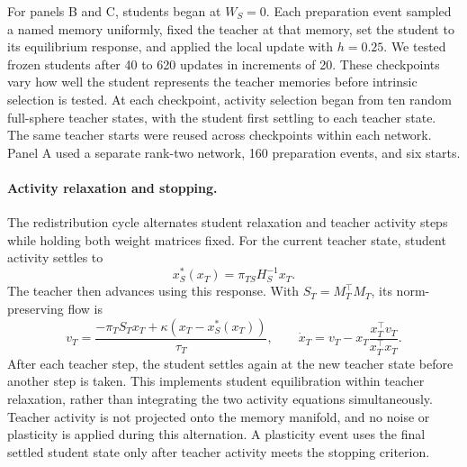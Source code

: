 \documentclass[10pt,letterpaper]{article}
\theoremstyle{plain}
\theoremstyle{remark}
\begin{document}
For panels B and C, students began at \(W_S=0\). Each preparation event sampled a named memory uniformly, fixed the teacher at that memory, set the student to its equilibrium response, and applied the local update with \(h=0.25\). We tested frozen students after 40 to 620 updates in increments of 20. These checkpoints vary how well the student represents the teacher memories before intrinsic selection is tested. At each checkpoint, activity selection began from ten random full-sphere teacher states, with the student first settling to each teacher state. The same teacher starts were reused across checkpoints within each network. Panel A used a separate rank-two network, 160 preparation events, and six starts.

\paragraph{Activity relaxation and stopping.}
The redistribution cycle alternates student relaxation and teacher activity steps while holding both weight matrices fixed. For the current teacher state, student activity settles to
\[
x_S^*(x_T)=\pi_{TS}H_S^{-1}x_T.
\]
The teacher then advances using this response. With \(S_T=M_T^\top M_T\), its norm-preserving flow is
\begin{equation}
v_T=\frac{-\pi_TS_Tx_T+\kappa(x_T-x_S^*(x_T))}{\tau_T},\qquad
\dot x_T=v_T-x_T\frac{x_T^\top v_T}{x_T^\top x_T}.
\label{eq:methods-settled-relaxation}
\end{equation}
After each teacher step, the student settles again at the new teacher state before another step is taken. This implements student equilibration within teacher relaxation, rather than integrating the two activity equations simultaneously. Teacher activity is not projected onto the memory manifold, and no noise or plasticity is applied during this alternation. A plasticity event uses the final settled student state only after teacher activity meets the stopping criterion.
\end{document}
